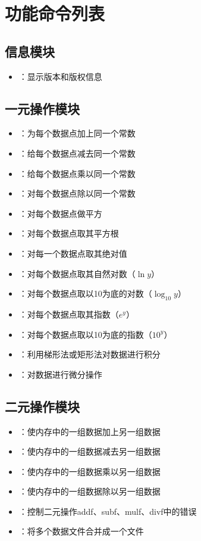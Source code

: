 \section*{功能命令列表}

\subsection*{信息模块}
\begin{itemize}
\item {}：显示版本和版权信息
\end{itemize}

\subsection*{一元操作模块}
\begin{itemize}
\item {}：为每个数据点加上同一个常数
\item {}：给每个数据点减去同一个常数
\item {}：给每个数据点乘以同一个常数
\item {}：对每个数据点除以同一个常数
\item {}：对每个数据点做平方
\item {}：对每个数据点取其平方根
\item {}：对每一个数据点取其绝对值
\item {}：对每个数据点取其自然对数（$\ln y$）
\item {}：对每个数据点取以10为底的对数（$\log_{10} y$）
\item {}：对每个数据点取其指数（$e^y$）
\item {}：对每个数据点取以10为底的指数（$10^y$）
\item {}：利用梯形法或矩形法对数据进行积分
\item {}：对数据进行微分操作
\end{itemize}

\subsection*{二元操作模块}
\begin{itemize}
\item {}：使内存中的一组数据加上另一组数据
\item {}：使内存中的一组数据减去另一组数据
\item {}：使内存中的一组数据乘以另一组数据
\item {}：使内存中的一组数据除以另一组数据
\item {}：控制二元操作addf、subf、mulf、divf中的错误
\item {}：将多个数据文件合并成一个文件
\end{itemize}

